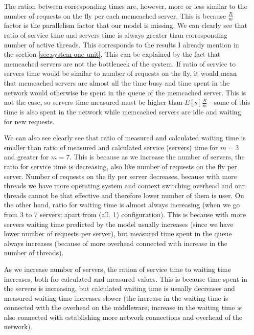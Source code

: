 \documentclass[11pt]{article}
\begin{document}
The ration between corresponding times are, however, more or less similar to the number of requests on the fly per each memcached server. This is because $\frac{R}{m}$ factor is the parallelism factor that our model is missing. We can clearly see that ratio of service time and servers time is always greater than corresponding number of active threads. This corresponds to the results I already mention in the section \ref{sec:system-one-unit}. This can be explained by the fact that memcached servers are not the bottleneck of the system. If ratio of service to servers time would be similar to number of requests on the fly, it would mean that memcached servers are almost all the time busy and time spent in the network would otherwise be spent in the queue of the memcached server. This is not the case, so servers time measured must be higher than $E[s]\frac{R}{m}$ - some of this time is also spent in the network while memcached servers are idle and waiting for new requests.

We can also see clearly see that ratio of measured and calculated waiting time is smaller than ratio of measured and calculated service (servers) time for $m=3$ and greater for $m=7$. This is because as we increase the number of servers, the ratio for service time is decreasing, also like number of requests on the fly per server. Number of requests on the fly per server decreases, because with more threads we have more operating system and context switching overhead and our threads cannot be that effective and therefore lower number of them is user. On the other hand, ratio for waiting time is almost always increasing (when we go from 3 to 7 servers; apart from (all, 1) configuration). This is because with more servers waiting time predicted by the model usually increases (since we have lower number of requests per server), but measured time spent in the queue always increases (because of more overhead connected with increase in the number of threads).

As we increase number of servers, the ration of service time to waiting time increases, both for calculated and measured values. This is because time spent in the servers is increasing, but calculated waiting time is usually decreases and measured waiting time increases slower (the increase in the waiting time is connected with the overhead on the middleware, increase in the waiting time is also connected with establishing more network connections and overhead of the network).

\end{document}
